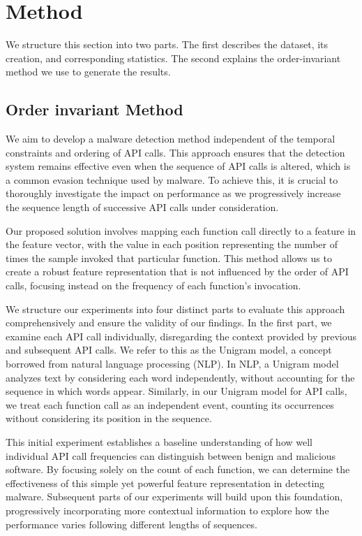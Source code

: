 \section{Method}
\label{sec:method}
We structure this section into two parts. The first describes the dataset, its creation, and corresponding statistics. 
The second explains the order-invariant method we use to generate the results.

\subsection{Order invariant Method}
We aim to develop a malware detection method independent of the temporal constraints and ordering of API calls. This approach ensures that the detection system remains effective even when the sequence of API calls is altered, which is a common evasion technique used by malware. To achieve this, it is crucial to thoroughly investigate the impact on performance as we progressively increase the sequence length of successive API calls under consideration.

Our proposed solution involves mapping each function call directly to a feature in the feature vector, with the value in each position representing the number of times the sample invoked that particular function. This method allows us to create a robust feature representation that is not influenced by the order of API calls, focusing instead on the frequency of each function's invocation.

We structure our experiments into four distinct parts to evaluate this approach comprehensively and ensure the validity of our findings. In the first part, we examine each API call individually, disregarding the context provided by previous and subsequent API calls. We refer to this as the Unigram model, a concept borrowed from natural language processing (NLP). In NLP, a Unigram model analyzes text by considering each word independently, without accounting for the sequence in which words appear. Similarly, in our Unigram model for API calls, we treat each function call as an independent event, counting its occurrences without considering its position in the sequence.

This initial experiment establishes a baseline understanding of how well individual API call frequencies can distinguish between benign and malicious software. By focusing solely on the count of each function, we can determine the effectiveness of this simple yet powerful feature representation in detecting malware. Subsequent parts of our experiments will build upon this foundation, progressively incorporating more contextual information to explore how the performance varies following different lengths of sequences.

